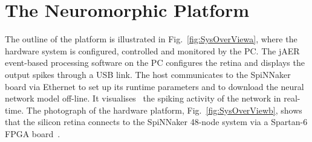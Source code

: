 
\section{The Neuromorphic Platform}
\label{sec:np}
The outline of the platform is illustrated in Fig.~\ref{fig:SysOverViewa}, where the hardware system is configured, controlled and monitored by the PC.
The jAER~\cite{delbruck2008frame} event-based processing software on the PC configures the retina and displays the output spikes through a USB link.
The host communicates to the SpiNNaker board via Ethernet to set up its runtime parameters and to download the neural network model off-line.
It visualises~\cite{6252490} the spiking activity of the network in real-time.
The photograph of the hardware platform, Fig.~\ref{fig:SysOverViewb}, shows that the silicon retina connects to the SpiNNaker 48-node system via a Spartan-6 FPGA board~\cite{galluppi2012real}.


